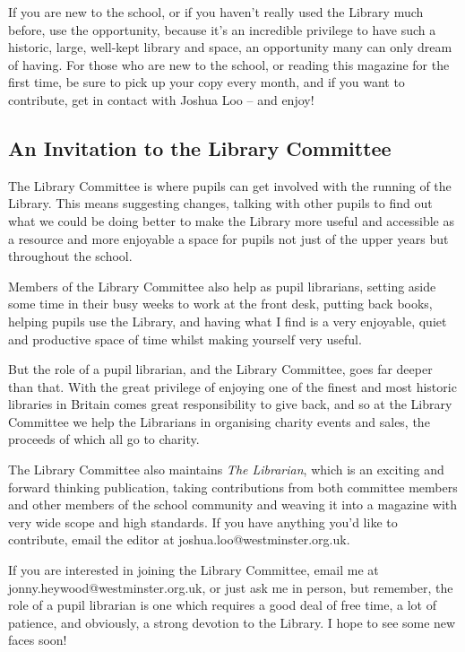 If you are new to the school, or if you haven’t really used the Library much before, use the opportunity, because it’s an incredible privilege to have such a historic, large, well-kept library and space, an opportunity many can only dream of having. For those who are new to the school, or reading this magazine for the first time, be sure to pick up your copy every month, and if you want to contribute, get in contact with Joshua Loo – and enjoy!

\subsection{An Invitation to the Library Committee}

The Library Committee is where pupils can get involved with the running of the Library. This means suggesting changes, talking with other pupils to find out what we could be doing better to make the Library more useful and accessible as a resource and more enjoyable a space for pupils not just of the upper years but throughout the school.

Members of the Library Committee also help as pupil librarians, setting aside some time in their busy weeks to work at the front desk, putting back books, helping pupils use the Library, and having what I find is a very enjoyable, quiet and productive space of time whilst making yourself very useful.

But the role of a pupil librarian, and the Library Committee, goes far deeper than that. With the great privilege of enjoying one of the finest and most historic libraries in Britain comes great responsibility to give back, and so at the Library Committee we help the Librarians in organising charity events and sales, the proceeds of which all go to charity.

The Library Committee also maintains \textit{The Librarian}, which is an exciting and forward thinking publication, taking contributions from both committee members and other members of the school community and weaving it into a magazine with very wide scope and high standards. If you have anything you’d like to contribute, email the editor at joshua.loo@westminster.org.uk.

If you are interested in joining the Library Committee, email me at jonny.heywood@westminster.org.uk, or just ask me in person, but remember, the role of a pupil librarian is one which requires a good deal of free time, a lot of patience, and obviously, a strong devotion to the Library. I hope to see some new faces soon!

